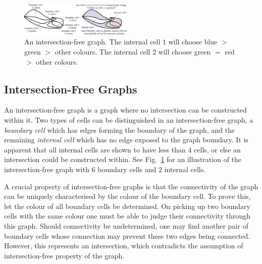 \documentclass[conference]{IEEEtran}
\begin{document}
\begin{figure}[t]
\centering
\includegraphics[width=0.48\textwidth]{figures/characteristic_string}
\caption{An intersection-free graph. The internal cell $1$ will choose blue $>$ green $>$ other colours. The internal cell $2$ will choose green $=$ red $>$ other colours.}\label{fig:characteristic_string}
\end{figure}

\subsection{Intersection-Free Graphs}

An intersection-free graph is a graph where no intersection can be constructed within it. Two types of cells can be distinguished in an intersection-free graph, a \textit{boundary cell} which has edges forming the boundary of the graph, and the remaining \textit{internal cell} which has no edge exposed to the graph boundary. It is apparent that all internal cells are shown to have less than $4$ cells, or else an intersection could be constructed within. 
See Fig.~\ref{fig:characteristic_string} for an illustration of the intersection-free graph with $6$ boundary cells and $2$ internal cells. 

A crucial property of intersection-free graphs is that the connectivity of the graph can be uniquely characterised by the colour of the boundary cell. 
To prove this, let the colour of all boundary cells be determined. On picking up two boundary cells with the same colour one must be able to judge their connectivity through this graph. Should connectivity be undetermined, one may find another pair of boundary cells whose connection may prevent these two edges being connected. However, this represents an intersection, which contradicts the assumption of intersection-free property of the graph. 
\end{document}
